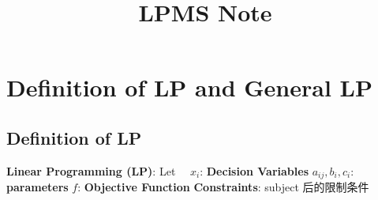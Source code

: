 \documentclass[9pt]{article}
\title{LPMS Note}
\author{}
\date{}
\begin{document}
\maketitle
\thispagestyle{fancy}
\vspace{-3.5cm}

\fontsize{10pt}{11pt}\selectfont
\setlength{\parindent}{8pt}

\section{Definition of LP and General LP} %

\subsection{Definition of LP}

\textbf{Linear Programming (LP)}: {\small Let \ \ $x_i$: \textbf{Decision Variables} \quad $a_{ij},b_i,c_i$: \textbf{parameters} \quad $f$: \textbf{Objective Function} \quad} {\scriptsize\textbf{Constraints}: subject 后的限制条件}
\end{document}
